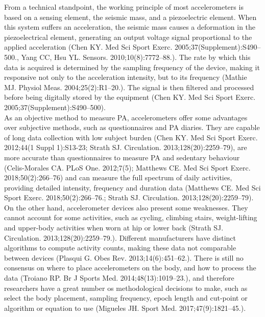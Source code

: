 \documentclass[11pt]{article}
\begin{document}
From a technical standpoint, the working principle of most accelerometers is based on a sensing element, the seismic mass, and a piezoelectric element. When this system suffers an acceleration, the seismic mass causes a deformation in the piezoelectrical element, generating an output voltage signal proportional to the applied acceleration {\tiny (Chen KY. Med Sci Sport Exerc. 2005;37(Supplement):S490–500., Yang CC, Hsu YL. Sensors. 2010;10(8):7772–88.)}. The rate by which this data is acquired is determined by the sampling frequency of the device, making it responsive not only to the acceleration intensity, but to its frequency {\tiny (Mathie MJ. Physiol Meas. 2004;25(2):R1–20.)}. The signal is then filtered and processed before being digitally stored by the equipment {\tiny (Chen KY. Med Sci Sport Exerc. 2005;37(Supplement):S490–500)}. \\

As an objective method to measure PA, accelerometers offer some advantages over subjective methods, such as questionnaires and PA diaries. They are capable of long data collection with low subject burden {\tiny (Chen KY. Med Sci Sport Exerc. 2012;44(1 Suppl 1):S13-23; Strath SJ. Circulation. 2013;128(20):2259–79)}, are more accurate than questionnaires to measure PA and sedentary behaviour {\tiny (Celis-Morales CA. PLoS One. 2012;7(5); Matthews CE. Med Sci Sport Exerc. 2018;50(2):266–76)} and can measure the full spectrum of daily activities, providing detailed intensity, frequency and duration data {\tiny (Matthews CE. Med Sci Sport Exerc. 2018;50(2):266–76.; Strath SJ. Circulation. 2013;128(20):2259–79)}. \\

On the other hand, accelerometer devices also present some weaknesses. They cannot account for some activities, such as cycling, climbing stairs, weight-lifting and upper-body activities when worn at hip or lower back {\tiny (Strath SJ. Circulation. 2013;128(20):2259–79.)}. Different manufacturers have distinct algorithms to compute activity counts, making these data not comparable between devices {\tiny (Plasqui G. Obes Rev. 2013;14(6):451–62.)}. There is still no consensus on where to place accelerometers on the body, and how to process the data {\tiny (Troiano RP. Br J Sports Med. 2014;48(13):1019–23.)}, and therefore researchers have a great number os methodological decisions to make, such as select the body placement, sampling frequency, epoch length and cut-point or algorithm or equation to use {\tiny (Migueles JH. Sport Med. 2017;47(9):1821–45.)}. \\
\end{document}
